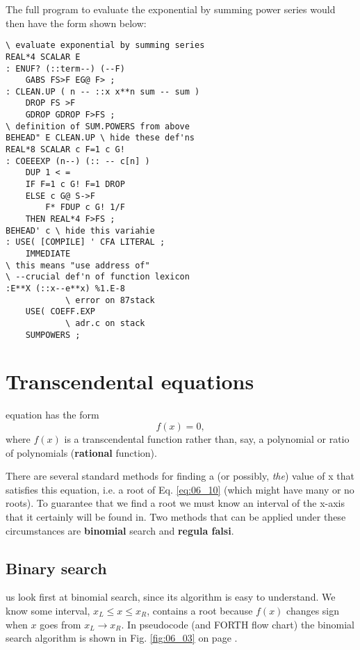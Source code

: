 The full program to evaluate the exponential by summing power series would then have the form shown below:

\begin{multicols}{2}
\begin{lstlisting}[basicstyle=\scriptsize,]
\ evaluate exponential by summing series
REAL*4 SCALAR E
: ENUF? (::term--) (--F)
    GABS FS>F EG@ F> ;
: CLEAN.UP ( n -- ::x x**n sum -- sum )
    DROP FS >F
    GDROP GDROP F>FS ;
\ definition of SUM.POWERS from above
BEHEAD" E CLEAN.UP \ hide these def'ns
REAL*8 SCALAR c F=1 c G!
: COEEEXP (n--) (:: -- c[n] )
    DUP 1 < =
    IF F=1 c G! F=1 DROP
    ELSE c G@ S->F
        F* FDUP c G! 1/F
    THEN REAL*4 F>FS ;
BEHEAD' c \ hide this variahie
: USE( [COMPILE] ' CFA LITERAL ;
    IMMEDIATE
\ this means "use address of"
\ --crucial def'n of function lexicon
:E**X (::x--e**x) %1.E-8
            \ error on 87stack
    USE( COEFF.EXP
            \ adr.c on stack
    SUMPOWERS ;
\end{lstlisting}
\end{multicols}

\section{Transcendental equations}

 equation has the form
\begin{equation}
f(x) = 0,
    \label{eq:06_10}
\end{equation}
where $f(x)$ is a transcendental function rather than, say, a polynomial or ratio of polynomials (\textbf{rational} function).

There are several standard methods for finding a (or possibly, \textit{the}) value of x that satisfies this equation, i.e. a root of Eq. \ref{eq:06_10} (which might have many or no roots). To guarantee that we find a root we must know an interval of the x-axis that it certainly will be found in. Two methods that can be applied under these circumstances are \textbf{binomial} search and \textbf{regula falsi}.

\subsection{Binary search}

 us look first at binomial search, since its algorithm is easy to understand. We know some interval, $x_L \leq x \leq x_R$, contains a root because $f(x)$ changes sign when $x$ goes from $x_L \rightarrow x_R$. In pseudocode (and FORTH flow chart) the binomial search algorithm is shown in Fig. \ref{fig:06_03} on page \pageref{fig:06_03}.

